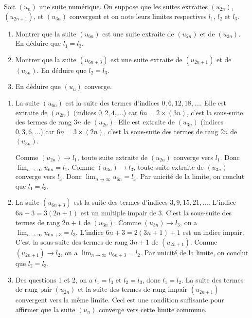 \documentclass[]{exercices}
\begin{document}
\begin{exercice}
	Soit $(u_{n})$ une suite numérique. On suppose que les suites extraites $(u_{2n})$, $(u_{2n + 1})$, et $(u_{3n})$ convergent et on note leurs limites respectives $l_1$, $l_2$ et $l_3$.
	\begin{enumerate}
		\item Montrer que la suite $(u_{6n})$ est une suite extraite de $(u_{2n})$ et de $(u_{3n})$. En déduire que $l_1=l_3$.
		\item Montrer que la suite $(u_{6n+3})$ est une suite extraite de $(u_{2n+1})$ et de $(u_{3n})$. En déduire que $l_2=l_3$.
		\item En déduire que $(u_n)$ converge.
	\end{enumerate}
\end{exercice}

\begin{solution}
	\begin{enumerate}
		\item La suite $(u_{6n})$ est la suite des termes d'indices $0, 6, 12, 18, \dots$.
		      Elle est extraite de $(u_{2n})$ (indices $0,2,4,\dots$) car $6n = 2 \times (3n)$, c'est la sous-suite des termes de rang $3n$ de $(u_{2n})$.
		      Elle est extraite de $(u_{3n})$ (indices $0,3,6,\dots$) car $6n = 3 \times (2n)$, c'est la sous-suite des termes de rang $2n$ de $(u_{3n})$.

		      Comme $(u_{2n}) \to l_1$, toute suite extraite de $(u_{2n})$ converge vers $l_1$. Donc $\lim_{n\to\infty} u_{6n} = l_1$.
		      Comme $(u_{3n}) \to l_3$, toute suite extraite de $(u_{3n})$ converge vers $l_3$. Donc $\lim_{n\to\infty} u_{6n} = l_3$.
		      Par unicité de la limite, on conclut que $l_1=l_3$.
		\item La suite $(u_{6n+3})$ est la suite des termes d'indices $3, 9, 15, 21, \dots$.
		      L'indice $6n+3 = 3(2n+1)$ est un multiple impair de 3. C'est la sous-suite des termes de rang $2n+1$ de $(u_{3n})$. Comme $(u_{3n}) \to l_3$, on a $\lim_{n\to\infty} u_{6n+3} = l_3$.
		      L'indice $6n+3 = 2(3n+1)+1$ est un indice impair. C'est la sous-suite des termes de rang $3n+1$ de $(u_{2n+1})$. Comme $(u_{2n+1}) \to l_2$, on a $\lim_{n\to\infty} u_{6n+3} = l_2$.
		      Par unicité de la limite, on conclut que $l_2=l_3$.
		\item Des questions 1 et 2, on a $l_1 = l_3$ et $l_2 = l_3$, donc $l_1 = l_2$.
		      La suite des termes de rang pair $(u_{2n})$ et la suite des termes de rang impair $(u_{2n+1})$ convergent vers la même limite.
		      Ceci est une condition suffisante pour affirmer que la suite $(u_n)$ converge vers cette limite commune.
	\end{enumerate}
\end{solution}
\end{document}
